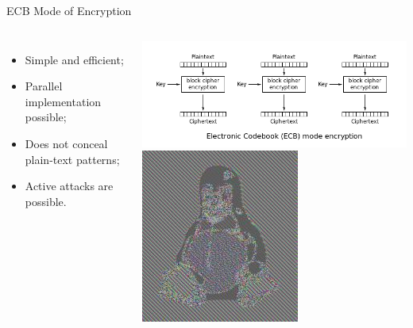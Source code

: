 \documentclass[12pt,table,xcolor={dvipsnames}]{beamer}
\begin{document}
\begin{frame}{ECB Mode of Encryption}
\begin{columns}
\begin{itemize}
\item Simple and efficient;\pause
\item Parallel implementation possible;\pause
\item Does not conceal plain-text patterns;\pause
\item Active attacks are possible.\pause
\end{itemize}
\begin{center}
\includegraphics[scale=.25]{ECB_encryption.png}\pause\\
\includegraphics[scale=.35]{Tux_ecb.jpg}
\end{center}
\end{columns}
\end{frame}
\end{document}
